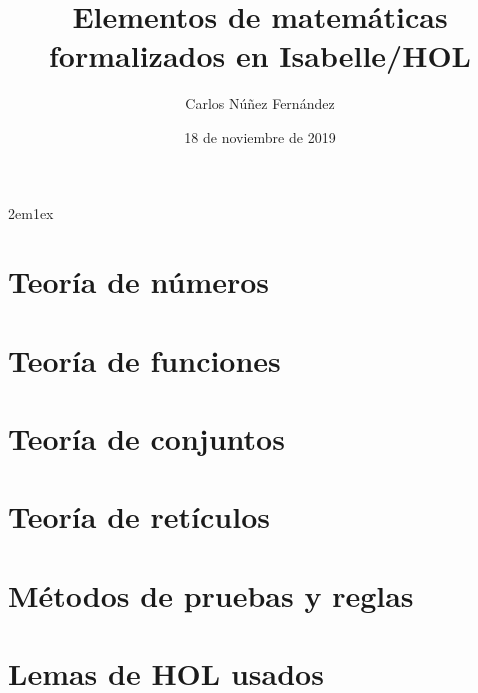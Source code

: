 \documentclass[12pt,a4paper,twoside]{book}
\begin{document}
\title{Elementos de matemáticas formalizados en Isabelle/HOL}
\author{Carlos Núñez Fernández}
\date{18 de noviembre de 2019}
\maketitle


\tableofcontents

\parindent 2em\parskip 1ex

% 


\chapter{Teoría de números}


\chapter{Teoría de funciones}


\chapter{Teoría de conjuntos}

\chapter{Teoría de retículos}



\appendix

\chapter{Métodos de pruebas y reglas}


\chapter{Lemas de HOL usados}


\nocite{LMF, tutorial}



\todototoc
\listoftodos
\end{document}
